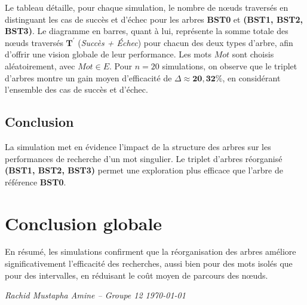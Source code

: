 \documentclass{article}
\begin{document}
\small
Le tableau détaille, pour chaque simulation, le nombre de nœuds traversés en distinguant les cas de succès et d’échec pour les arbres \textbf{BST0} et \textbf{(BST1, BST2, BST3)}. Le diagramme en barres, quant à lui, représente la somme totale des nœuds traversés $\mathbf{T^{\prime}}$  (\textit{Succès + Échec}) pour chacun des deux types d’arbre, afin d’offrir une vision globale de leur performance. Les mots $\mathit{Mot}$ sont choisis aléatoirement, avec $\mathit{Mot} \in \mathit{E}$. Pour $n = 20$ simulations, on observe que le triplet d'arbres montre un gain moyen d'efficacité de $\Delta \approx \mathbf{20{,}32\%}$, en considérant l’ensemble des cas de succès et d’échec.
\subsection{Conclusion}
\small
La simulation met en évidence l’impact de la structure des arbres sur les performances de recherche d'un mot singulier. Le triplet d'arbres réorganisé \textbf{(BST1, BST2, BST3)} permet une exploration plus efficace que l’arbre de référence \textbf{BST0}. 

\section{Conclusion globale}
En résumé, les simulations confirment que la réorganisation des arbres améliore significativement l’efficacité des recherches, aussi bien pour des mots isolés que pour des intervalles, en réduisant le coût moyen de parcours des nœuds.

\vspace{0.3cm}
{\scriptsize \textit{Rachid Mustapha Amine – Groupe 12 \hfill \today}}
\end{document}
